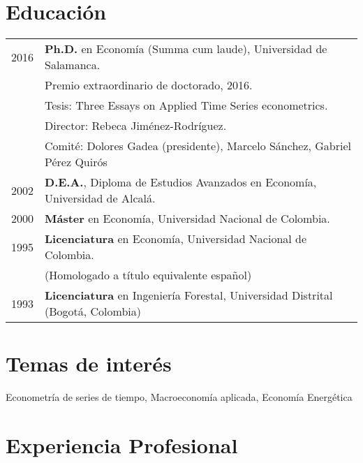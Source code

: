 \documentclass[11pt]{article}\usepackage[]{graphicx}\usepackage[]{color}
\begin{document}
\section{Educación} 

\begin{tabular}{rl{-2cm}} %

2016 & \textbf{Ph.D.} en Economía (Summa cum laude), Universidad de Salamanca.\\
& Premio extraordinario de doctorado, 2016.\\
& Tesis: Three Essays on Applied Time Series econometrics.\\
& Director: Rebeca Jiménez-Rodríguez.\\
& Comité: Dolores Gadea (presidente), Marcelo Sánchez, Gabriel Pérez Quirós\\

2002 & \textbf{D.E.A.}, Diploma de Estudios Avanzados en Economía, Universidad de Alcalá.\\
	 
2000 & \textbf{Máster} en Economía, Universidad Nacional de Colombia.\\

1995 & \textbf{Licenciatura} en Economía, Universidad Nacional de Colombia.\\
& (Homologado a título equivalente español)\\

1993 & \textbf{Licenciatura} en Ingeniería Forestal, Universidad Distrital (Bogotá, Colombia)\\

\end{tabular}
\vspace{10pt}

\section{Temas de interés}

Econometría de series de tiempo, Macroeconomía aplicada, Economía Energética

\section{Experiencia Profesional} 
\end{document}
